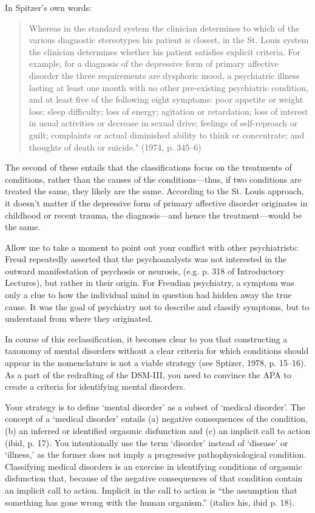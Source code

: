 \begin{refsection}
In Spitzer's own words:

\begin{quote}

Whereas in the standard system the clinician determines to which of the various diagnostic stereotypes his patient is closest, in the St. Louis system the clinician determines whether his patient satisfies explicit criteria. For example, for a diagnosis of the depressive form of primary affective disorder the three requirements are dysphoric mood, a psychiatric illness lasting at least one month with no other pre-existing psychiatric condition, and at least five of the following eight symptoms: poor appetite or weight loss; sleep difficulty; loss of energy; agitation or retardation; loss of interest in usual activities or decrease in sexual drive; feelings of self-reproach or guilt; complaints or actual diminished ability to think or concentrate; and thoughts of death or suicide." (1974, p. 345--6)
\end{quote}

The second of these entails that the classifications focus on the treatments of conditions, rather than the causes of the conditions---thus, if two conditions are treated the same, they likely are the same. According to the St. Louis approach, it doesn't matter if the depressive form of primary affective disorder originates in childhood or recent trauma, the diagnosis---and hence the treatment---would be the same.

Allow me to take a moment to point out your conflict with other psychiatrists: Freud repeatedly asserted that the psychoanalysts was not interested in the outward manifestation of psychosis or neurosis, (e.g. p. 318 of Introductory Lectures), but rather in their origin. For Freudian psychiatry, a symptom was only a clue to how the individual mind in question had hidden away the true cause. It was the goal of psychiatry not to describe and classify symptoms, but to understand from where they originated.

In course of this reclassification, it becomes clear to you that constructing a taxonomy of mental disorders without a clear criteria for which conditions should appear in the nomenclature is not a viable strategy (see Sptizer, 1978, p. 15--16). As a part of the redrafting of the DSM-III, you need to convince the APA to create a criteria for identifying mental disorders. 

Your strategy is to define `mental disorder' as a subset of `medical disorder'. The concept of a `medical disorder' entails (a) negative consequences of the condition, (b) an inferred or identified orgasmic disfunction and (c) an implicit call to action (ibid, p. 17). You intentionally use the term `disorder' instead of `disease' or `illness,' as the former does not imply a progressive pathophysiological condition. Classifying medical disorders is an exercise in identifying conditions of orgasmic disfunction that, because of the negative consequences of that condition contain an implicit call to action. Implicit in the call to action is ``the assumption that something has gone wrong with the human organism.'' (italics his, ibid p. 18).


\end{refsection}
